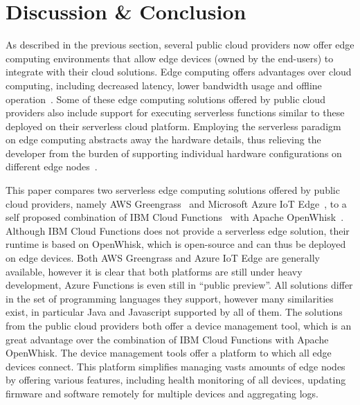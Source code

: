 \documentclass[article]{aaltoseries}
\begin{document}
\section{Discussion \& Conclusion}\label{sec:discussion-conclusion}
As described in the previous section, several public cloud providers now offer edge computing environments that allow edge devices (owned by the end-users) to integrate with their cloud solutions.
Edge computing offers advantages over cloud computing, including decreased latency, lower bandwidth usage and offline operation~\cite{shi_edge_2016}.
Some of these edge computing solutions offered by public cloud providers also include support for executing serverless functions similar to these deployed on their serverless cloud platform.
Employing the serverless paradigm on edge computing abstracts away the hardware details, thus relieving the developer from the burden of supporting individual hardware configurations on different edge nodes~\cite{nastic_serverless_2017}.

This paper compares two serverless edge computing solutions offered by public cloud providers, namely AWS Greengrass~\cite{amazon_aws_nodate} and Microsoft Azure IoT Edge~\cite{microsoft_iot_2018}, to a self proposed combination of IBM Cloud Functions~\cite{ibm_cloud_2018} with Apache OpenWhisk~\cite{the_apache_software_foundation_apache_nodate}.
Although IBM Cloud Functions does not provide a serverless edge solution, their runtime is based on OpenWhisk, which is open-source and can thus be deployed on edge devices.
Both AWS Greengrass and Azure IoT Edge are generally available, however it is clear that both platforms are still under heavy development, Azure Functions is even still in ``public preview''.
All solutions differ in the set of programming languages they support, however many similarities exist, in particular Java and Javascript supported by all of them.
The solutions from the public cloud providers both offer a device management tool, which is an great advantage over the combination of IBM Cloud Functions with Apache OpenWhisk.
The device management tools offer a platform to which all edge devices connect.
This platform simplifies managing vasts amounts of edge nodes by offering various features, including health monitoring of all devices, updating firmware and software remotely for multiple devices and aggregating logs.

\end{document}
